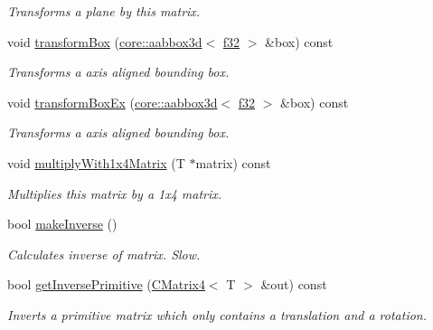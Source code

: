 \begin{DoxyCompactItemize}
\begin{DoxyCompactList}\small\item\em Transforms a plane by this matrix. \end{DoxyCompactList}\item 
void \hyperlink{classirr_1_1core_1_1CMatrix4_a0e6a0a3b1b20aac7313806fdb1a01316}{transform\+Box} (\hyperlink{classirr_1_1core_1_1aabbox3d}{core\+::aabbox3d}$<$ \hyperlink{namespaceirr_a0277be98d67dc26ff93b1a6a1d086b07}{f32} $>$ \&box) const
\begin{DoxyCompactList}\small\item\em Transforms a axis aligned bounding box. \end{DoxyCompactList}\item 
void \hyperlink{classirr_1_1core_1_1CMatrix4_a2fcdfa14ef16240470e2b46d19a5cb43}{transform\+Box\+Ex} (\hyperlink{classirr_1_1core_1_1aabbox3d}{core\+::aabbox3d}$<$ \hyperlink{namespaceirr_a0277be98d67dc26ff93b1a6a1d086b07}{f32} $>$ \&box) const
\begin{DoxyCompactList}\small\item\em Transforms a axis aligned bounding box. \end{DoxyCompactList}\item 
\mbox{\label{classirr_1_1core_1_1CMatrix4_a21e0a68953d63bd1fca70a671a9e93b8}} 
void \hyperlink{classirr_1_1core_1_1CMatrix4_a21e0a68953d63bd1fca70a671a9e93b8}{multiply\+With1x4\+Matrix} (T $\ast$matrix) const
\begin{DoxyCompactList}\small\item\em Multiplies this matrix by a 1x4 matrix. \end{DoxyCompactList}\item 
bool \hyperlink{classirr_1_1core_1_1CMatrix4_a3fbface2cb6b959af64f82a5bb17540e}{make\+Inverse} ()
\begin{DoxyCompactList}\small\item\em Calculates inverse of matrix. Slow. \end{DoxyCompactList}\item 
bool \hyperlink{classirr_1_1core_1_1CMatrix4_aaeab6a8672ecc3d9790c8e7f141db795}{get\+Inverse\+Primitive} (\hyperlink{classirr_1_1core_1_1CMatrix4}{C\+Matrix4}$<$ T $>$ \&out) const
\begin{DoxyCompactList}\small\item\em Inverts a primitive matrix which only contains a translation and a rotation. \end{DoxyCompactList}\item 

\end{DoxyCompactItemize}

